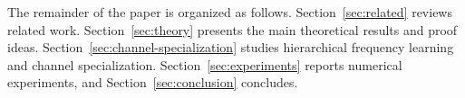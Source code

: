 \documentclass[nohyperref]{article}
\theoremstyle{plain}
\newtheorem{theorem}{Theorem}[section]
\theoremstyle{definition}
\theoremstyle{remark}
\begin{document}
The remainder of the paper is organized as follows.
Section~\ref{sec:related} reviews related work.
Section~\ref{sec:theory} presents the main theoretical results and proof ideas.
Section~\ref{sec:channel-specialization} studies hierarchical frequency
learning and channel specialization.
Section~\ref{sec:experiments} reports numerical experiments, and
Section~\ref{sec:conclusion} concludes.






    



\end{document}
